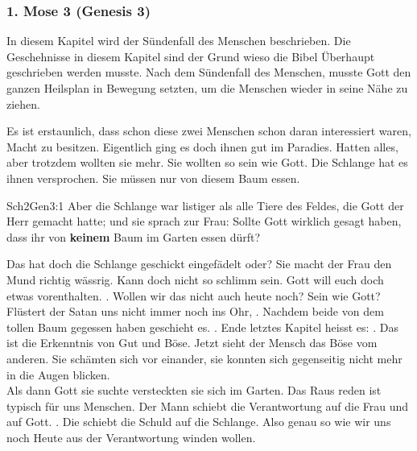 
\subsubsection{1. Mose 3 (Genesis 3)}
In diesem Kapitel wird der Sündenfall des Menschen beschrieben. Die Geschehnisse in diesem Kapitel sind der Grund wieso die Bibel Überhaupt geschrieben werden musste. Nach dem Sündenfall des Menschen, musste Gott den ganzen Heilsplan in Bewegung setzten, um die Menschen wieder in seine Nähe zu ziehen.

Es ist erstaunlich, dass schon diese zwei Menschen schon daran interessiert waren, Macht zu besitzen. Eigentlich ging es doch ihnen gut im Paradies. Hatten alles, aber trotzdem wollten sie mehr. Sie wollten so sein wie Gott. Die Schlange hat es ihnen versprochen. Sie müssen nur von diesem Baum essen.
\begin{bibeltext}{Sch2}{Gen}{3:1}
	Aber die Schlange war listiger als alle Tiere des Feldes, die Gott der Herr gemacht hatte; und sie sprach zur Frau: Sollte Gott wirklich gesagt haben, dass ihr von \textbf{keinem} Baum im Garten essen dürft?
\end{bibeltext}
Das hat doch die Schlange geschickt eingefädelt oder? Sie macht der Frau den Mund richtig wässrig. Kann doch nicht so schlimm sein. Gott will euch doch etwas vorenthalten. . Wollen wir das nicht auch heute noch? Sein wie Gott? Flüstert der Satan uns nicht immer noch ins Ohr, .
Nachdem beide von dem tollen Baum gegessen haben geschieht es. . Ende letztes Kapitel heisst es: . Das ist die Erkenntnis von Gut und Böse. Jetzt sieht der Mensch das Böse vom anderen. Sie schämten sich vor einander, sie konnten sich gegenseitig nicht mehr in die Augen blicken.\\
Als dann Gott sie suchte versteckten sie sich im Garten. Das Raus reden ist typisch für uns Menschen. Der Mann schiebt die Verantwortung auf die Frau und auf Gott. . Die schiebt die Schuld auf die Schlange. Also genau so wie wir uns noch Heute aus der Verantwortung winden wollen.

